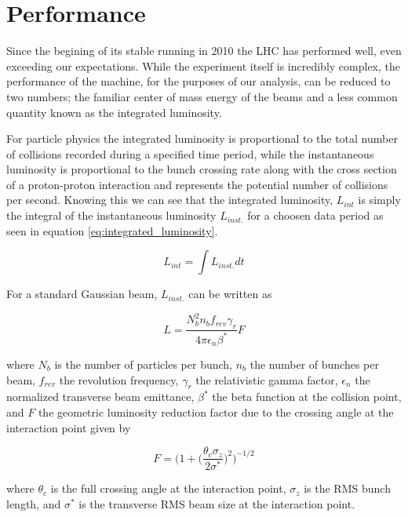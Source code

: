 \section{Performance} \label{sec:lhc:performance}

Since the begining of its stable running in 2010 the LHC has performed well,
even exceeding our expectations.  While the experiment itself is incredibly
complex, the performance of the machine, for the purposes of our analysis, can
be reduced to two numbers; the familiar center of mass energy of the beams and a
less common quantity known as the integrated luminosity.  

For particle physics the integrated luminosity is proportional to the total
number of collisions recorded during a specified time period, while the
instantaneous luminosity is proportional to the bunch crossing rate along with
the cross section of a proton-proton interaction and represents the potential
number of collisions per second.  Knowing this we can see that the integrated
luminosity, $L_{int}$ is simply the integral of the instantaneous luminosity
$L_{inst.}$ for a choosen data period as seen in equation
\ref{eq:integrated_luminosity}.

\begin{equation} \label{eq:integrated_luminosity}
   L_{int} = \int L_{inst.}dt 
\end{equation}

For a standard Gaussian beam, $L_{inst.}$ can be written as

\begin{equation}
  L = \frac{N_{b}^{2}n_{b}f_{rev}\gamma_{r}}{4\pi\epsilon_{n}\beta^{*}}F
\end{equation}

where $N_{b}$ is the number of particles per bunch, $n_{b}$ the number of
bunches per beam, $f_{rev}$ the revolution frequency, $\gamma_{r}$ the
relativistic gamma factor, $\epsilon_{n}$ the normalized transverse beam
emittance, $\beta^{*}$ the beta function at the collision point, and $F$ the
geometric luminosity reduction factor due to the crossing angle at the
interaction point given by

\begin{equation}
  F = \bigg(1 + \Big( \frac{\theta_{c}\sigma_{z}}{2\sigma^{*}} \Big) ^{2}
\bigg)^{-1/2} 
\end{equation}

where $\theta_{c}$ is the full crossing angle at the interaction point,
$\sigma_{z}$ is the RMS bunch length, and $\sigma^{*}$ is the transverse RMS
beam size at the interaction point.

